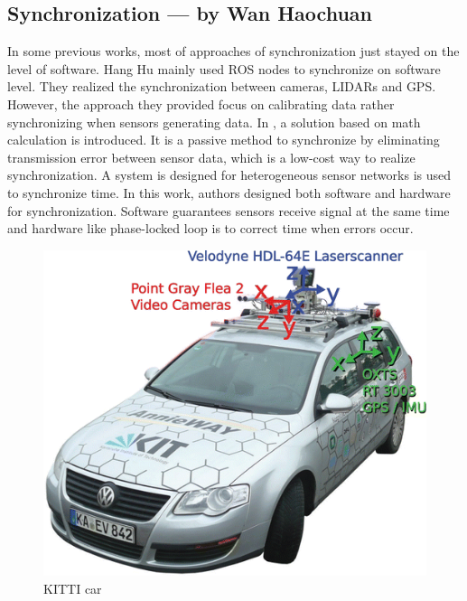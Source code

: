 \documentclass[conference]{IEEEtran}
\begin{document}
\subsection{Synchronization --- by Wan Haochuan}
	In some previous works, most of approaches of synchronization just stayed on the level of software. Hang Hu \cite{1} mainly used ROS nodes to synchronize on software level. They realized the synchronization between cameras, LIDARs and GPS. However, the approach they provided focus on calibrating data rather synchronizing when sensors generating data.
	In \cite{Olson2010A}, a solution based on math calculation is introduced. It is a passive method to synchronize by eliminating transmission error between sensor data, which is a low-cost way to realize synchronization.
	A system \cite{Amundson2006Time} is designed for heterogeneous sensor networks is used to synchronize time. In this work, authors designed both software and hardware for synchronization. Software guarantees sensors receive signal at the same time and hardware like phase-locked loop is to correct time when errors occur.
	\par
	\begin{figure}
		\centering
		\includegraphics[width=.4\textwidth]{kitti_car.png}
		\caption{KITTI car}
		\label{car}
	\end{figure}
\end{document}
